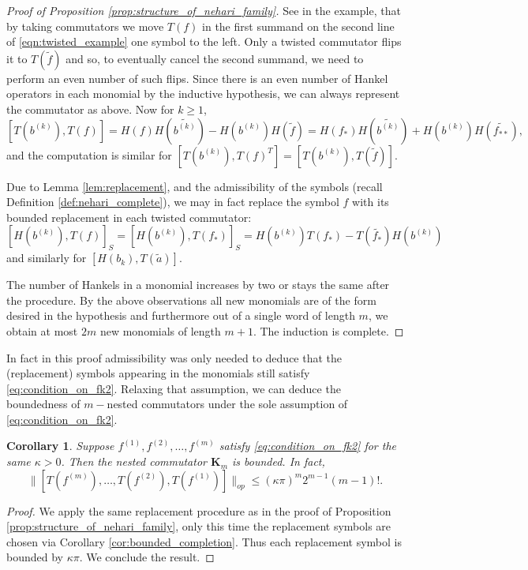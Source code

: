 \documentclass[11pt]{amsart}
\theoremstyle{plain}
\newtheorem{corollary}[theorem]{Corollary}
\theoremstyle{remark}
\numberwithin{equation}{section}
\begin{document}
\begin{proof}[Proof of Proposition \ref{prop:structure_of_nehari_family}]
See in the example, that by taking commutators we move $T(f)$ in the first summand on the second line of \eqref{eqn:twisted_example} one symbol to the left. Only a twisted commutator flips it to $T(\widetilde{f})$ and so, to eventually cancel the second summand, we need to perform an even number of such flips. Since there is an even number of Hankel operators in each monomial by the inductive hypothesis, we can always represent the commutator as above.
Now for $k\geq 1$,
 $$[T(b^{(k)}), T(f)]=H(f)H(\widetilde{b^{(k)}})- H(b^{(k)})H(\widetilde{f})=H(f_*)H(\widetilde{b^{(k)}})+H(b^{(k)})H(\widetilde{{f}_{**}}),$$
 and the computation is similar for $[T(b^{(k)}), T(f)^T]=[T(b^{(k)}), T(\widetilde{f})]$.


Due to Lemma \ref{lem:replacement}, and the admissibility of the symbols (recall Definition \ref{def:nehari_complete}), we may in fact replace the symbol $f$ with its bounded replacement in each twisted commutator:
$$[H(b^{(k)}), T(f)]_S=[H(b^{(k)}),T(f_*)]_S= H(b^{(k)})T(f_*)-T(\widetilde{f_*})H(b^{(k)})$$
and similarly for $[H(b_k), T(\widetilde{a})]$. 


The number of Hankels in a monomial increases by two or stays the same after the procedure. By the above observations all new monomials are of the form desired in the hypothesis and furthermore out of a single word of length $m$, we obtain at most $2m$ new monomials of length $m+1$.
The induction is complete.
\end{proof}

In fact in this proof admissibility was only needed to deduce that the (replacement) symbols appearing in the monomials still satisfy \eqref{eq:condition_on_fk2}. Relaxing that assumption, we can deduce the boundedness of $m-$nested commutators under the sole assumption of \eqref{eq:condition_on_fk2}.

\begin{corollary}\label{cor:nehari+hilbert}
Suppose $f^{(1)}, f^{(2)},\ldots, f^{(m)}$ satisfy \eqref{eq:condition_on_fk2} for the same $\kappa>0$.
Then the nested commutator $\mathbf{K}_m$ is bounded. 
In fact,
$$\|
[T(f^{(m)}),\ldots, T(f^{(2)}), T(f^{(1)})]
\|_{op}
\leq (\kappa\pi)^m 2^{m-1}(m-1)!.
$$
\end{corollary}
\begin{proof}
We apply the same replacement procedure as in the proof of Proposition \ref{prop:structure_of_nehari_family}, only this time the replacement symbols are chosen via Corollary \ref{cor:bounded_completion}. 
Thus each replacement symbol is bounded by $\kappa\pi$. We conclude the result.
\end{proof}
\end{document}
